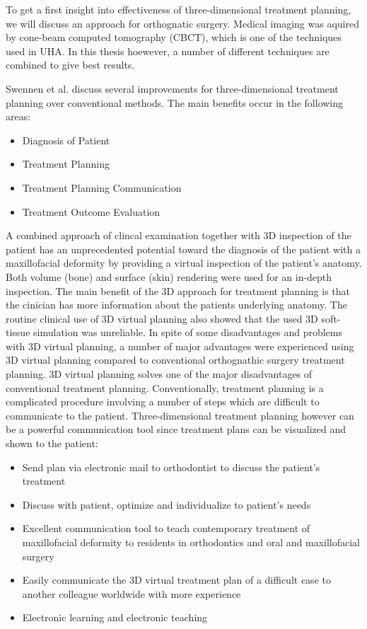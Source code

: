 To get a first insight into effectiveness of three-dimensional treatment planning, we will discuss an approach for orthognatic surgery.
Medical imaging was aquired by cone-beam computed tomography (CBCT), which is one of the techniques used in UHA.
In this thesis hoewever, a number of different techniques are combined to give best results.

Swennen et al. discuss several improvements for three-dimensional treatment planning over conventional methods.
The main benefits occur in the following areas:

\begin{itemize}
    \item Diagnosis of Patient
    \item Treatment Planning
    \item Treatment Planning Communication
    \item Treatment Outcome Evaluation
\end{itemize}

A combined approach of clincal examination together with 3D inspection of the patient has an unprecedented potential toward the diagnosis of the patient with a maxillofacial deformity \cite{swennen2009three} by providing a virtual inspection of the patient’s anatomy.
Both volume (bone) and surface (skin) rendering were used for an in-depth inspection.
The main benefit of the 3D approach for treatment planning is that the cinician has more information about the patients underlying anatomy.
The routine clinical use of 3D virtual planning also showed that the used 3D soft-tissue simulation was unreliable.
In spite of some disadvantages and problems with 3D virtual planning, a number of major advantages were experienced using 3D virtual planning compared to conventional orthognathic surgery treatment planning.
3D virtual planning solves one of the major disadvantages of conventional treatment planning. Conventionally, treatment planning is a complicated procedure involving a number of steps which are difficult to communicate to the patient.
Three-dimensional treatment planning however can be a powerful communication tool since treatment plans can be visualized and shown to the patient:

\begin{itemize}
    \item Send plan via electronic mail to orthodontist to discuss the patient’s treatment
    \item Discuss with patient, optimize and individualize to patient's needs
    \item Excellent communication tool to teach contemporary treatment of maxillofacial deformity to residents in orthodontics and oral and maxillofacial surgery
    \item Easily communicate the 3D virtual treatment plan of a difficult case to another colleague worldwide with more experience
    \item Electronic learning and electronic teaching
\end{itemize}

